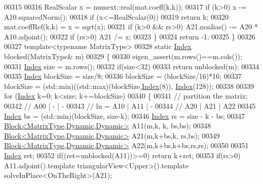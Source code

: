\begin{DoxyCode}
00315 
00316       RealScalar x = numext::real(mat.coeff(k,k));
00317       \textcolor{keywordflow}{if} (k>0) x -= A10.squaredNorm();
00318       \textcolor{keywordflow}{if} (x<=RealScalar(0))
00319         \textcolor{keywordflow}{return} k;
00320       mat.coeffRef(k,k) = x = sqrt(x);
00321       \textcolor{keywordflow}{if} (k>0 && rs>0) A21.noalias() -= A20 * A10.adjoint();
00322       \textcolor{keywordflow}{if} (rs>0) A21 /= x;
00323     \}
00324     \textcolor{keywordflow}{return} -1;
00325   \}
00326 
00327   \textcolor{keyword}{template}<\textcolor{keyword}{typename} MatrixType>
00328   \textcolor{keyword}{static} \hyperlink{namespace_eigen_a62e77e0933482dafde8fe197d9a2cfde}{Index} blocked(MatrixType& m)
00329   \{
00330     eigen\_assert(m.rows()==m.cols());
00331     \hyperlink{namespace_eigen_a62e77e0933482dafde8fe197d9a2cfde}{Index} size = m.rows();
00332     \textcolor{keywordflow}{if}(size<32)
00333       \textcolor{keywordflow}{return} unblocked(m);
00334 
00335     \hyperlink{namespace_eigen_a62e77e0933482dafde8fe197d9a2cfde}{Index} blockSize = size/8;
00336     blockSize = (blockSize/16)*16;
00337     blockSize = (std::min)((std::max)(blockSize,\hyperlink{namespace_eigen_a62e77e0933482dafde8fe197d9a2cfde}{Index}(8)), \hyperlink{namespace_eigen_a62e77e0933482dafde8fe197d9a2cfde}{Index}(128));
00338 
00339     \textcolor{keywordflow}{for} (\hyperlink{namespace_eigen_a62e77e0933482dafde8fe197d9a2cfde}{Index} k=0; k<size; k+=blockSize)
00340     \{
00341       \textcolor{comment}{// partition the matrix:}
00342       \textcolor{comment}{//       A00 |  -  |  -}
00343       \textcolor{comment}{// lu  = A10 | A11 |  -}
00344       \textcolor{comment}{//       A20 | A21 | A22}
00345       \hyperlink{namespace_eigen_a62e77e0933482dafde8fe197d9a2cfde}{Index} bs = (std::min)(blockSize, size-k);
00346       \hyperlink{namespace_eigen_a62e77e0933482dafde8fe197d9a2cfde}{Index} rs = size - k - bs;
00347       \hyperlink{group___core___module_class_eigen_1_1_block}{Block<MatrixType,Dynamic,Dynamic>} A11(m,k,   k,   bs,bs);
00348       \hyperlink{group___core___module_class_eigen_1_1_block}{Block<MatrixType,Dynamic,Dynamic>} A21(m,k+bs,k,   rs,bs);
00349       \hyperlink{group___core___module_class_eigen_1_1_block}{Block<MatrixType,Dynamic,Dynamic>} A22(m,k+bs,k+bs,rs,rs);
00350 
00351       \hyperlink{namespace_eigen_a62e77e0933482dafde8fe197d9a2cfde}{Index} ret;
00352       \textcolor{keywordflow}{if}((ret=unblocked(A11))>=0) \textcolor{keywordflow}{return} k+ret;
00353       \textcolor{keywordflow}{if}(rs>0) A11.adjoint().template triangularView<Upper>().\textcolor{keyword}{template} solveInPlace<OnTheRight>(A21);

\end{DoxyCode}
